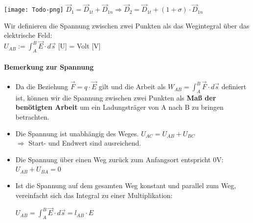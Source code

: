 \texttt{[image: Todo-png]}
\formulaBegin
$\vec{D}_1 = \vec{D}_{1t} + \vec{D}_{1n} \Rightarrow \vec{D}_2 = \vec{D}_{1t} + (1 + \sigma) \cdot \vec{D}_{1n}$
\formulaEnd
\iend


\beginip
Wir definieren die Spannung zwischen zwei Punkten als das Wegintegral über das elektrische Feld: \\
\formulaBegin
$ U_{AB} :=  \int_A^B \vec{E} \cdot d\vec{s} $
\formulaEnd
{[U]} = Volt {[V]}
\iend

\paragraph{Bemerkung zur Spannung}

\begin{itemize}

	\item	Da die Beziehung $\vec{F} =  q \cdot \vec{E} $ gilt und die Arbeit als $ W_{AB} = \int_A^B \vec{F} \cdot d\vec{s}$ definiert ist, können wir die Spannung zwischen zwei Punkten als \textbf{Maß der benötigten Arbeit} um ein Ladungsträger von A nach B zu bringen betrachten.  \\
	\item Die Spannung ist unabhängig des Weges.  $U_{AC} = U_{AB} + U_{BC}$
	      \\ $\Rightarrow$ Start- und Endwert sind ausreichend. \\
	\item Die Spannung über einen Weg zurück zum Anfangsort entspricht 0V: $U_{AB} + U_{BA} = 0$ \\
	\item Ist die Spannung auf dem gesamten Weg konstant und parallel zum Weg, vereinfacht sich das Integral zu einer Multiplikation: \\
	      \begin{center}
	      	$ U_{AB} = \int_{A}^{B} \vec{E}\cdot d\vec{s} = l_{AB} \cdot E$
	      \end{center}
\end{itemize}


\newpage
